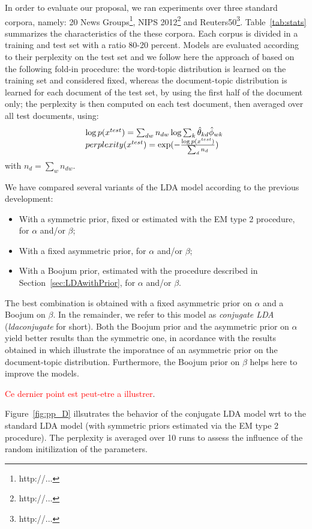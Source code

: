 In order to evaluate our proposal, we ran experiments over three standard corpora, namely: 20 News Groups\footnote{http://...}, NIPS 2012\footnote{http://...} and Reuters50\footnote{http://...}. Table~\ref{tab:stats} summarizes the characteristics of the these corpora. Each corpus is divided in a training and test set with a ratio 80-20 percent. Models are evaluated according to their perplexity on the test set and we follow here the  approach of \cite{asuncion_smoothing_2009} based on the following fold-in procedure: the word-topic distribution is learned on the training set and considered fixed, whereas the document-topic distribution is learned for each document of the test set, by using the first half of the document only; the perplexity is then computed on each test document, then averaged over all test documents, using:
%
\[
\begin{array}{l@{\hspace{.3cm}}l}
\log p(x^{test}) = \sum_{dw} n_{dw} \log \sum_k \hat{\theta}_{kd} \hat{\phi}_{wk} \\
perplexity(x^{test}) = \exp(- \frac{\log p(x^{test})}{\sum_d n_d})
\end{array}
\]
%
with $n_d = \sum_w n_{dw}$.

We have compared several variants of the LDA model according to the previous development:
%
\begin{itemize}
\item With a symmetric prior, fixed or estimated with the EM type 2 procedure, for $\alpha$ and/or $\beta$;
\item With a fixed asymmetric prior, for $\alpha$ and/or $\beta$;
\item With a Boojum prior, estimated with the procedure described in Section~\ref{sec:LDAwithPrior}, for $\alpha$ and/or $\beta$.
\end{itemize}
%
The best combination is obtained with a fixed asymmetric prior on $\alpha$ and a Boojum on $\beta$. In the remainder, we refer to this model as {\it conjugate LDA} ({\it ldaconjugate} for short). Both the Boojum prior and the asymmetric prior on $\alpha$ yield better results than the symmetric one, in acordance with the results obtained in \cite{wallach_rethinking_2009} which illustrate the imporatnce of an asymmetric prior on the document-topic distribution. Furthermore, the Boojum prior on $\beta$ helps here to improve the models.

\textcolor{red}{Ce dernier point est peut-etre a illustrer}.

Figure~\ref{fig:pp_D} illsutrates the behavior of the conjugate LDA model wrt to the standard LDA model (with symmetric priors estimated via the EM type 2 procedure). The perplexity is averaged over 10 runs to assess the influence of the random initilization of the parameters. 

